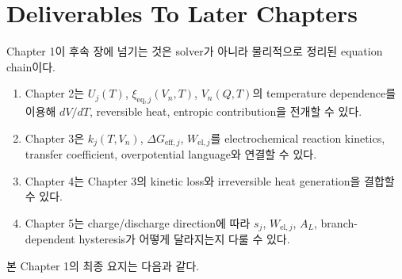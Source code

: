 \documentclass[11pt]{article}
\newcommand{\eq}{\mathrm{eq}}
\newcommand{\eff}{\mathrm{eff}}
\begin{document}
\section{Deliverables To Later Chapters}\label{sec:deliverables}

Chapter 1이 후속 장에 넘기는 것은 solver가 아니라 물리적으로 정리된 equation chain이다.

\begin{enumerate}[label=\textbf{D\arabic*.}]
\item Chapter 2는 \(U_j(T)\), \(\xi_{\eq,j}(V_n,T)\), \(V_n(Q,T)\)의 temperature dependence를 이용해 \(dV/dT\), reversible heat, entropic contribution을 전개할 수 있다.
\item Chapter 3은 \(k_j(T,V_n)\), \(\Delta G_{\eff,j}\), \(W_{\mathrm{el},j}\)를 electrochemical reaction kinetics, transfer coefficient, overpotential language와 연결할 수 있다.
\item Chapter 4는 Chapter 3의 kinetic loss와 irreversible heat generation을 결합할 수 있다.
\item Chapter 5는 charge/discharge direction에 따라 \(s_j\), \(W_{\mathrm{el},j}\), \(A_L\), branch-dependent hysteresis가 어떻게 달라지는지 다룰 수 있다.
\end{enumerate}

본 Chapter 1의 최종 요지는 다음과 같다.

\begin{center}
\end{center}
\end{document}
